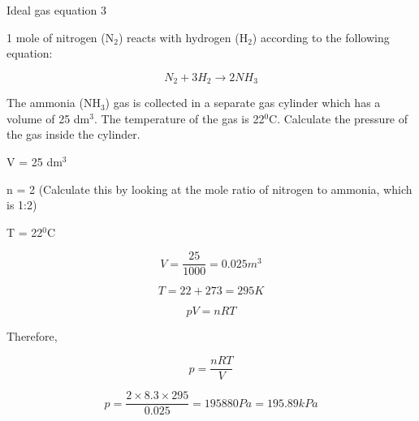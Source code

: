 \begin{wex}{Ideal gas equation 3}{1 mole of nitrogen (N$_{2}$) reacts with hydrogen (H$_{2}$) according to the following equation:

\begin{equation*}
N_{2} + 3H_{2} \rightarrow 2NH_{3}
\end{equation*}

The ammonia (NH$_{3}$) gas is collected in a separate gas cylinder which has a volume of 25 dm$^{3}$. The temperature of the gas is 22$^{0}$C. Calculate the pressure of the gas inside the cylinder.\\
}

{

V = 25 dm$^{3}$

n = 2 (Calculate this by looking at the mole ratio of nitrogen to ammonia, which is 1:2)

T = 22$^{0}$C
\\
}

{

\begin{equation*}
V = \frac{25}{1000} = 0.025 m^{3}
\end{equation*}

\begin{equation*}
T = 22 + 273 = 295 K
\end{equation*}
}

{

\begin{equation*}
pV = nRT
\end{equation*}

Therefore,

\begin{equation*}
p = \frac{nRT}{V}
\end{equation*}
}

{

\begin{equation*}
p = \frac{2 \times 8.3 \times 295}{0.025} = 195880 Pa = 195.89 kPa
\end{equation*}
}
\end{wex}

